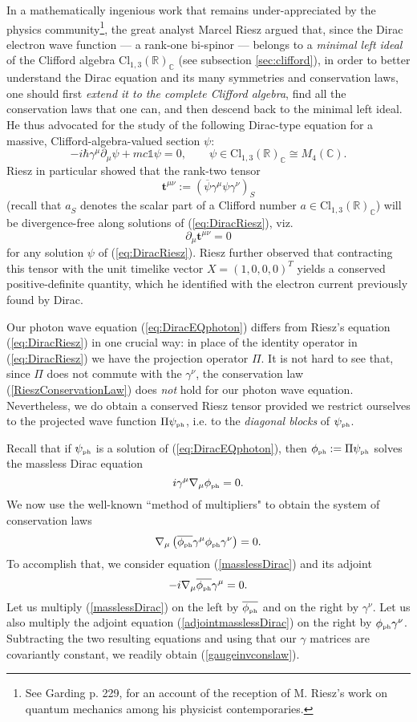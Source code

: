 \documentclass[11pt]{article}
\theoremstyle{definition}
\newcommand{\refeq}[1]{(\ref{#1})}
\numberwithin{equation}{section}
\newcommand{\bt}{\mathbf{t}}
\newcommand{\beq}{\begin{equation}}
\newcommand{\eeq}{\end{equation}}
\newcommand{\Id}{\mathds{1}}
\newcommand{\p}{\partial}
\newcommand{\psiPH}{{\psi_{\mbox{\rm\tiny ph}}}}
\newcommand{\phiPH}{{\phi_{\mbox{\rm\tiny ph}}}}
\newcommand{\Cset}{{\mathbb C}}
\newcommand{\Rset}{{\mathbb R}}
\newcommand{\ga}{\gamma}
\newcommand{\nab}{\nabla}
\begin{document}
In a mathematically ingenious work \cite{Rie1946} that remains under-appreciated by the physics community\footnote{See 
  Garding \cite{GardingHISTORY} p. 229,  for an account of the reception of M. Riesz's work on quantum mechanics among 
  his physicist contemporaries.}, 
the great analyst Marcel Riesz argued that, since the Dirac electron wave function --- a rank-one bi-spinor --- belongs to 
a {\em minimal left ideal} of the Clifford algebra $\mbox{Cl}_{1,3}(\Rset)_\Cset$ (see subsection \ref{sec:clifford}), in order to better understand the Dirac equation 
and its many symmetries and conservation laws, one should first {\em extend it to the complete Clifford algebra}, find all the 
conservation laws that one can, and then descend back to the minimal left ideal. 
 He thus advocated for the study of the following Dirac-type equation for a massive, Clifford-algebra-valued section $\psi$:
\beq\label{eq:DiracRiesz}
-i\hbar \ga^\mu \p_\mu \psi + m c \Id \psi = 0,\qquad \psi \in \mbox{Cl}_{1,3}(\Rset)_\Cset \cong M_4(\Cset).
\eeq
 Riesz in particular showed that the rank-two tensor 
\beq\label{RieszTENSORdef}
\bt^{\mu\nu} := (\overline{\psi} \ga^\mu\psi\ga^\nu)_S^{}
\eeq
 (recall that $a_S^{}$ denotes the scalar part of a Clifford number $a\in \mbox{Cl}_{1,3}(\Rset)_\Cset$)  
will be divergence-free along solutions of \refeq{eq:DiracRiesz}, viz.
\beq\label{RieszConservationLaw}
\p_\mu \bt^{\mu\nu} = 0
\eeq 
for any solution $\psi$ of \refeq{eq:DiracRiesz}.
 Riesz further observed that contracting this tensor with the unit timelike vector $X = (1,0,0,0)^T$ yields a conserved 
positive-definite quantity, which he identified with the electron current previously found by Dirac.  

 Our photon wave equation \refeq{eq:DiracEQphoton} differs from Riesz's equation \refeq{eq:DiracRiesz} in one crucial way:
in place of the identity operator in \refeq{eq:DiracRiesz} we have the projection operator $\Pi$.
  It is not hard to see that, since $\Pi$ does not commute with the $\ga^\nu$, the conservation law 
\refeq{RieszConservationLaw} does {\em not} hold for our photon wave equation. 
 Nevertheless, we do obtain a conserved Riesz tensor provided we restrict ourselves to the projected wave function $\Pi\psiPH$, 
i.e. to the {\em diagonal blocks} of $\psiPH$.

 Recall that if $\psiPH$ is a solution of \refeq{eq:DiracEQphoton}, then $\phiPH :=\Pi\psiPH$ solves the massless Dirac equation
\beq \label{masslessDirac}
i\ga^\mu \nab_\mu \phiPH = 0.
\eeq
We now use the well-known ``method of multipliers" to obtain the system of conservation laws
\beq \label{gaugeinvconslaw}
\nab_\mu \left( \overline{\phiPH} \ga^\mu \phiPH \ga^\nu\right) = 0.
\eeq
 To accomplish that, we consider equation \refeq{masslessDirac} and its adjoint
\beq \label{adjointmasslessDirac}
-i \nab_\mu \overline{\phiPH} \ga^\mu = 0.
\eeq
 Let us multiply \refeq{masslessDirac} on the left by $\overline{\phiPH}$ and on the right by $\ga^\nu$. 
 Let us also multiply the adjoint equation \refeq{adjointmasslessDirac} on the right by $\phiPH \ga^\nu$.
  Subtracting the two resulting equations and using that our $\gamma$ matrices are covariantly constant, 
we readily obtain \refeq{gaugeinvconslaw}.
\end{document}
